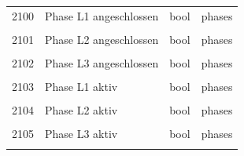 \documentclass[a4paper,10pt]{article}
\newcommand{\tdesc}[1]{\multicolumn{3}{l}{\footnotesize #1}}
\begin{document}
\begin{tabularx}{\textwidth}{rXll}
2100          & Phase L1 angeschlossen                  & bool         & phases                                                 \\
              & \tdesc{}                                                                                                        \\ \cmidrule{2-4}
2101          & Phase L2 angeschlossen                  & bool         & phases                                                 \\
              & \tdesc{}                                                                                                        \\ \cmidrule{2-4}
2102          & Phase L3 angeschlossen                  & bool         & phases                                                 \\
              & \tdesc{}                                                                                                        \\ \cmidrule{2-4}
2103          & Phase L1 aktiv                          & bool         & phases                                                 \\
              & \tdesc{}                                                                                                        \\ \cmidrule{2-4}
2104          & Phase L2 aktiv                          & bool         & phases                                                 \\
              & \tdesc{}                                                                                                        \\ \cmidrule{2-4}
2105          & Phase L3 aktiv                          & bool         & phases                                                 \\
              & \tdesc{}                                                                                                        \\ \bottomrule
   \end{tabularx}
\end{document}
